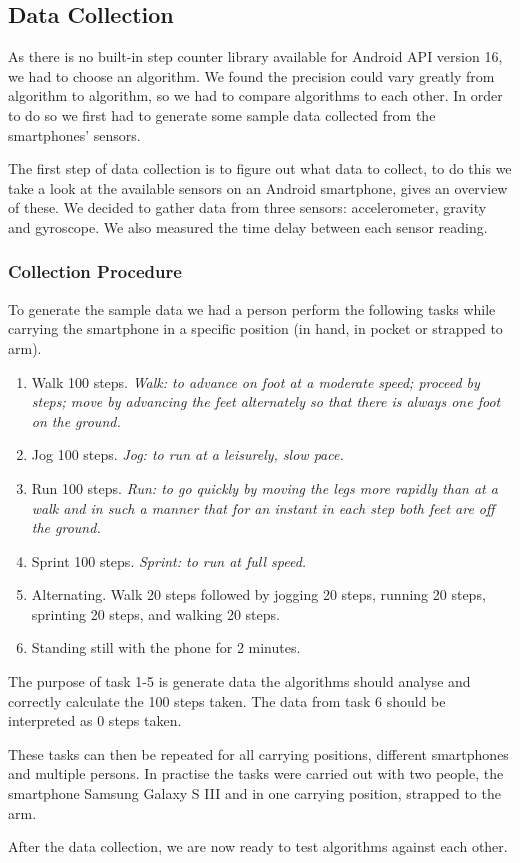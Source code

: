 \subsection{Data Collection}
As there is no built-in step counter library available for Android API version 16, we had to choose an algorithm. We found the precision could vary greatly from algorithm to algorithm, so we had to compare algorithms to each other. In order to do so we first had to generate some sample data collected from the smartphones' sensors. 

The first step of data collection is to figure out what data to collect, to do this we take a look at the available sensors on an Android smartphone, \citet{android:sensor} gives an overview of these. We decided to gather data from three sensors: accelerometer, gravity and gyroscope. We also measured the time delay between each sensor reading.

\subsubsection{Collection Procedure}
To generate the sample data we had a person perform the following tasks while carrying the smartphone in a specific position (in hand, in pocket or strapped to arm).
\begin{enumerate}
\item Walk 100 steps. \textit{Walk: to advance on foot at a moderate speed; proceed by steps; move by advancing the feet alternately so that there is always one foot on the ground.}\citep[Walk]{dict:reference} %
\item Jog 100 steps. \textit{Jog: to run at a leisurely, slow pace.}\citep[Jog]{dict:reference} %
\item Run 100 steps. \textit{Run: to go quickly by moving the legs more rapidly than at a walk and in such a manner that for an instant in each step both feet are off the ground.}\citep[Run]{dict:reference} %
\item Sprint 100 steps. \textit{Sprint: to run at full speed.}\citep[Sprint]{dict:reference} %
\item Alternating. Walk 20 steps followed by jogging 20 steps, running 20 steps, sprinting 20 steps, and walking 20 steps.
\item Standing still with the phone for 2 minutes.
\end{enumerate}

The purpose of task 1-5 is generate data the algorithms should analyse and correctly calculate the 100 steps taken. The data from task 6 should be interpreted as 0 steps taken.

These tasks can then be repeated for all carrying positions, different smartphones and multiple persons. In practise the tasks were carried out with two people, the smartphone Samsung Galaxy S III and in one carrying position, strapped to the arm.

After the data collection, we are now ready to test algorithms against each other.